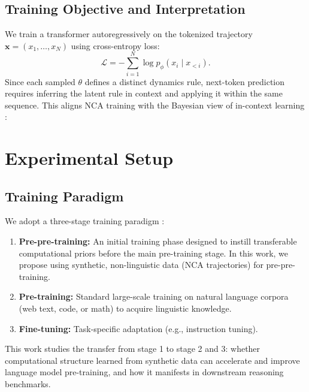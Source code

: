 \documentclass{article}
\newcommand{\akarsh}[1]{\textcolor{red}{AK: #1}}
\newcommand{\ryan}[1]{\textcolor{magenta}{RB: #1}}
\theoremstyle{plain}
\theoremstyle{definition}
\theoremstyle{remark}
\begin{document}
\subsection{Training Objective and Interpretation}
We train a transformer autoregressively on the tokenized trajectory $\mathbf{x}=(x_1,\dots,x_N)$ using cross-entropy loss:
\begin{equation}
\mathcal{L} = -\sum_{i=1}^{N} \log p_\phi(x_i \mid x_{<i}).
\end{equation}
Since each sampled $\theta$ defines a distinct dynamics rule, next-token prediction requires inferring the latent rule in context and applying it within the same sequence. This aligns NCA training with the Bayesian view of in-context learning \citep{han2025emergenceeffectivenesstaskvectors, xie2022explanationincontextlearningimplicit}:

\section{Experimental Setup}
\label{sec:exp_setup}


\subsection{Training Paradigm}
We adopt a three-stage training paradigm \citep{shinnick2025transformers, hu2025circuitschomskyprepretrainingformal, bloem2025universalpretrainingiteratedrandom}:
\begin{enumerate}
    \item \textbf{Pre-pre-training:} An initial training phase designed to instill transferable computational priors before the main pre-training stage. In this work, we propose using synthetic, non-linguistic data (NCA trajectories) for pre-pre-training.
    \item \textbf{Pre-training:} Standard large-scale training on  natural language corpora (web text, code, or math) to acquire linguistic knowledge.
    \item \textbf{Fine-tuning:} Task-specific adaptation (e.g., instruction tuning).
\end{enumerate}
This work studies the transfer from stage 1 to stage 2 and 3: whether computational structure learned from synthetic data can accelerate and improve language model pre-training, and how it manifests in downstream reasoning benchmarks.
\end{document}
